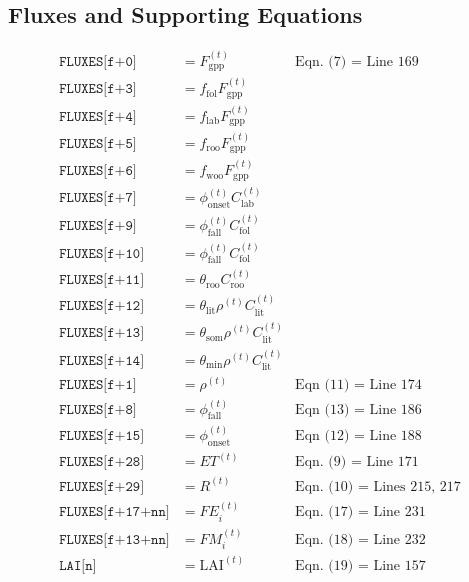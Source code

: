 \documentclass{article}
\begin{document}
		\subsection{Fluxes and Supporting Equations}
			\begin{align*}
				\texttt{FLUXES[f+0]} &= F_\text{gpp}^{(t)} & \text{Eqn. (7) = Line 169}\\
				\texttt{FLUXES[f+3]} &= f_\text{fol}F_\text{gpp}^{(t)}\\
				\texttt{FLUXES[f+4]} &= f_\text{lab}F_\text{gpp}^{(t)}\\
				\texttt{FLUXES[f+5]} &= f_\text{roo}F_\text{gpp}^{(t)}\\
				\texttt{FLUXES[f+6]} &= f_\text{woo}F_\text{gpp}^{(t)}\\
				\texttt{FLUXES[f+7]} &= \phi_\text{onset}^{(t)}C_\text{lab}^{(t)}\\
				\texttt{FLUXES[f+9]} &= \phi_\text{fall}^{(t)}C_\text{fol}^{(t)}\\
				\texttt{FLUXES[f+10]} &= \phi_\text{fall}^{(t)}C_\text{fol}^{(t)}\\
				\texttt{FLUXES[f+11]} &= \theta_\text{roo}C_\text{roo}^{(t)}\\
				\texttt{FLUXES[f+12]} &= \theta_\text{lit}\rho^{(t)}C_\text{lit}^{(t)}\\
				\texttt{FLUXES[f+13]} &= \theta_\text{som}\rho^{(t)}C_\text{lit}^{(t)}\\
				\texttt{FLUXES[f+14]} &= \theta_\text{min}\rho^{(t)}C_\text{lit}^{(t)}\\
				\texttt{FLUXES[f+1]} &= \rho^{(t)} & \text{Eqn (11) = Line 174}\\
				\texttt{FLUXES[f+8]} &= \phi_\text{fall}^{(t)} & \text{Eqn (13) = Line 186}\\
				\texttt{FLUXES[f+15]} &= \phi_\text{onset}^{(t)} & \text{Eqn (12) = Line 188}\\
				\texttt{FLUXES[f+28]} &= ET^{(t)} & \text{Eqn. (9) = Line 171}\\
				\texttt{FLUXES[f+29]} &= R^{(t)} & \text{Eqn. (10) = Lines 215, 217}\\
				\texttt{FLUXES[f+17+nn]} &= FE_i^{(t)} & \text{Eqn. (17) = Line 231}\\
				\texttt{FLUXES[f+13+nn]} &= FM_i^{(t)} & \text{Eqn. (18) = Line 232}\\
				\texttt{LAI[n]} &= \text{LAI}^{(t)} & \text{Eqn. (19) = Line 157}
			\end{align*}
\end{document}
